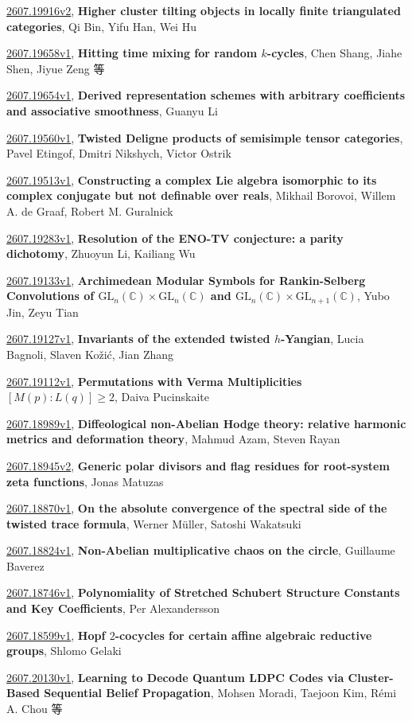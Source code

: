 \documentclass[9pt, a4paper]{article}
\theoremstyle{plain}
\theoremstyle{definition}
\theoremstyle{remark}
\newcommand{\arxiv}[3]{\href{https://arxiv.org/abs/#1}{#1}, \textbf{\textcolor{arxivblue}{#2}}, #3}
\begin{document}
\arxiv{2607.19916v2}{Higher cluster tilting objects in locally finite triangulated categories}{Qi Bin, Yifu Han, Wei Hu}

\arxiv{2607.19658v1}{Hitting time mixing for random $k$-cycles}{Chen Shang, Jiahe Shen, Jiyue Zeng 等}

\arxiv{2607.19654v1}{Derived representation schemes with arbitrary coefficients and associative smoothness}{Guanyu Li}

\arxiv{2607.19560v1}{Twisted Deligne products of semisimple tensor categories}{Pavel Etingof, Dmitri Nikshych, Victor Ostrik}

\arxiv{2607.19513v1}{Constructing a complex Lie algebra isomorphic to its complex conjugate but not definable over reals}{Mikhail Borovoi, Willem A. de Graaf, Robert M. Guralnick}

\arxiv{2607.19283v1}{Resolution of the ENO-TV conjecture: a parity dichotomy}{Zhuoyun Li, Kailiang Wu}

\arxiv{2607.19133v1}{Archimedean Modular Symbols for Rankin-Selberg Convolutions of $\mathrm{GL}_n(\mathbb{C})\times\mathrm{GL}_n(\mathbb{C})$ and $\mathrm{GL}_n(\mathbb{C})\times\mathrm{GL}_{n+1}(\mathbb{C})$}{Yubo Jin, Zeyu Tian}

\arxiv{2607.19127v1}{Invariants of the extended twisted $h$-Yangian}{Lucia Bagnoli, Slaven Kožić, Jian Zhang}

\arxiv{2607.19112v1}{Permutations with Verma Multiplicities $[M(p):L(q)] \geq 2$}{Daiva Pucinskaite}

\arxiv{2607.18989v1}{Diffeological non-Abelian Hodge theory: relative harmonic metrics and deformation theory}{Mahmud Azam, Steven Rayan}

\arxiv{2607.18945v2}{Generic polar divisors and flag residues for root-system zeta functions}{Jonas Matuzas}

\arxiv{2607.18870v1}{On the absolute convergence of the spectral side of the twisted trace formula}{Werner Müller, Satoshi Wakatsuki}

\arxiv{2607.18824v1}{Non-Abelian multiplicative chaos on the circle}{Guillaume Baverez}

\arxiv{2607.18746v1}{Polynomiality of Stretched Schubert Structure Constants and Key Coefficients}{Per Alexandersson}

\arxiv{2607.18599v1}{Hopf $2$-cocycles for certain affine algebraic reductive groups}{Shlomo Gelaki}

\arxiv{2607.20130v1}{Learning to Decode Quantum LDPC Codes via Cluster-Based Sequential Belief Propagation}{Mohsen Moradi, Taejoon Kim, Rémi A. Chou 等}
\end{document}

